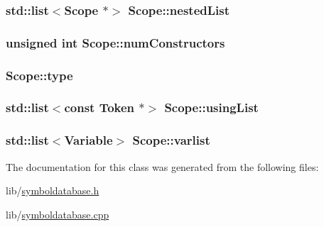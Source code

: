 \hypertarget{class_scope_aab597d177f8fc399c3f2714d86967845}{
\subsubsection[{nested\-List}]{\setlength{\rightskip}{0pt plus 5cm}std\-::list$<${\bf Scope} $\ast$$>$ Scope\-::nested\-List}}\label{class_scope_aab597d177f8fc399c3f2714d86967845}
\hypertarget{class_scope_a61571028d8578220ad47a33d56c162ca}{
\subsubsection[{num\-Constructors}]{\setlength{\rightskip}{0pt plus 5cm}unsigned int Scope\-::num\-Constructors}}\label{class_scope_a61571028d8578220ad47a33d56c162ca}
\hypertarget{class_scope_a497c6539e9aca0fde06064ad578c3215}{
\subsubsection[{type}]{ Scope\-::type}}\label{class_scope_a497c6539e9aca0fde06064ad578c3215}
\hypertarget{class_scope_a5f172bf299a4a5c7ccb431a4e1bffdb1}{
\subsubsection[{using\-List}]{\setlength{\rightskip}{0pt plus 5cm}std\-::list$<$const {\bf Token} $\ast$$>$ Scope\-::using\-List}}\label{class_scope_a5f172bf299a4a5c7ccb431a4e1bffdb1}
\hypertarget{class_scope_a2254a4b1978050716ba23435b38f9af2}{
\subsubsection[{varlist}]{\setlength{\rightskip}{0pt plus 5cm}std\-::list$<${\bf Variable}$>$ Scope\-::varlist}}\label{class_scope_a2254a4b1978050716ba23435b38f9af2}


The documentation for this class was generated from the following files\-:\begin{DoxyCompactItemize}
\item 
lib/\hyperlink{symboldatabase_8h}{symboldatabase.\-h}\item 
lib/\hyperlink{symboldatabase_8cpp}{symboldatabase.\-cpp}\end{DoxyCompactItemize}
